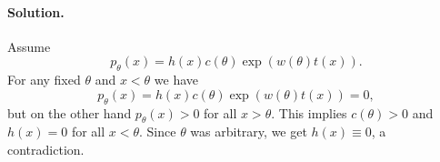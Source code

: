 \documentclass[11pt,oldfontcommands,oneside,onecolumn]{memoir}
\begin{document}
\paragraph{Solution. } Assume 
\begin{equation}
    p_\theta(x)=h(x)c(\theta)\exp(w(\theta) t(x)).
\end{equation}
For any fixed $\theta$ and $x<\theta$ we have
$$p_\theta(x)=h(x)c(\theta)\exp(w(\theta) t(x))=0,$$ but on the other hand
$p_\theta(x)>0$ for all $x>\theta$. This implies $c(\theta)>0$ and $h(x)=0$ for
all $x<\theta$. Since $\theta$ was arbitrary, we get $h(x)\equiv 0$, a
contradiction.
\end{document}
